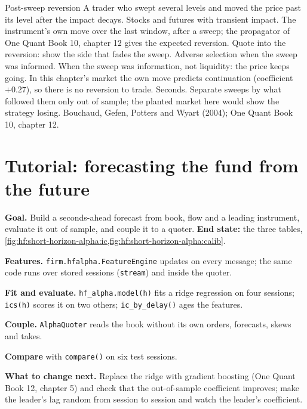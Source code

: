 \begin{strategyfile}{Post-sweep reversion}\label{strat:hf:short-horizon-alpha:sweep}
 A trader who swept several levels and moved the price past its level after the impact decays.
 Stocks and futures with transient impact.
 The instrument's own move over the last window, after a sweep; the propagator of One Quant Book 10, chapter 12 gives the expected
reversion.
 Quote into the reversion: show the side that fades the sweep.
 Adverse selection when the sweep was informed.
 When the sweep was information, not liquidity: the price keeps going. In this chapter's market the own move predicts
continuation (coefficient $+0.27$), so there is no reversion to trade.
 Seconds.
 Separate sweeps by what followed them only out of sample; the planted market here would show the strategy losing.
 Bouchaud, Gefen, Potters and Wyart (2004); One Quant Book 10, chapter 12.
\end{strategyfile}

\section{Tutorial: forecasting the fund from the future}\label{tut:hf:short-horizon-alpha:tut}

\begin{tutorial}
\textbf{Goal.} Build a seconds-ahead forecast from book, flow and a leading instrument, evaluate it out of sample, and couple it to a quoter.
\textbf{End state:} the three tables, \cref{fig:hf:short-horizon-alpha:ic,fig:hf:short-horizon-alpha:calib}.
\begin{tutsteps}
\item \textbf{Features.} \texttt{firm.hfalpha.FeatureEngine} updates on every message; the same code runs over stored sessions (\texttt{stream})
and inside the quoter.
\label{lst:hf:short-horizon-alpha:features}
\item \textbf{Fit and evaluate.} \texttt{hf\_alpha.model(h)} fits a ridge regression on four sessions; \texttt{ics(h)} scores it on two others;
\texttt{ic\_by\_delay()} ages the features.
\item \textbf{Couple.} \texttt{AlphaQuoter} reads the book without its own orders, forecasts, skews and takes.
\label{lst:hf:short-horizon-alpha:quoter}
\item \textbf{Compare} with \texttt{compare()} on six test sessions.
\end{tutsteps}
\textbf{What to change next.} Replace the ridge with gradient boosting (One Quant Book 12, chapter 5) and check that the out-of-sample coefficient
improves; make the leader's lag random from session to session and watch the leader's coefficient.
\end{tutorial}

